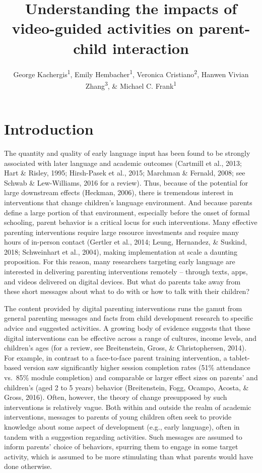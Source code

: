 \documentclass[man,floatsintext]{apa6}
\affiliation{
\vspace{0.5cm}
\textsuperscript{1} Department of Psychology, Stanford University\\\textsuperscript{2} Gallaudet University\\\textsuperscript{3} Cornell University}
\title{Understanding the impacts of video-guided activities on parent-child interaction}
\author{George Kachergis\textsuperscript{1}, Emily Hembacher\textsuperscript{1}, Veronica Cristiano\textsuperscript{2}, Hanwen Vivian Zhang\textsuperscript{3}, \& Michael C. Frank\textsuperscript{1}}
\date{}
\begin{document}
\maketitle

\hypertarget{introduction}{%
\section{Introduction}\label{introduction}}

The quantity and quality of early language input has been found to be strongly associated with later language and academic outcomes (Cartmill et al., 2013; Hart \& Risley, 1995; Hirsh-Pasek et al., 2015; Marchman \& Fernald, 2008; see Schwab \& Lew-Williams, 2016 for a review). Thus, because of the potential for large downstream effects (Heckman, 2006), there is tremendous interest in interventions that change children's language environment.
And because parents define a large portion of that environment, especially before the onset of formal schooling, parent behavior is a critical locus for such interventions.
Many effective parenting interventions require large resource investments and require many hours of in-person contact (Gertler et al., 2014; Leung, Hernandez, \& Suskind, 2018; Schweinhart et al., 2004), making implementation at scale a daunting proposition.
For this reason, many researchers targeting early language are interested in delivering parenting interventions remotely -- through texts, apps, and videos delivered on digital devices.
But what do parents take away from these short messages about what to do with or how to talk with their children?

The content provided by digital parenting interventions runs the gamut from general parenting messages and facts from child development research to specific advice and suggested activities.
A growing body of evidence suggests that these digital interventions can be effective across a range of cultures, income levels, and children's ages (for a review, see Breitenstein, Gross, \& Christophersen, 2014).
For example, in contrast to a face-to-face parent training intervention, a tablet-based version saw significantly higher session completion rates (51\% attendance vs.~85\% module completion) and comparable or larger effect sizes on parents' and children's (aged 2 to 5 years) behavior (Breitenstein, Fogg, Ocampo, Acosta, \& Gross, 2016).
Often, however, the theory of change presupposed by such interventions is relatively vague.
Both within and outside the realm of academic interventions, messages to parents of young children often seek to provide knowledge about some aspect of development (e.g., early language), often in tandem with a suggestion regarding activities.
Such messages are assumed to inform parents' choice of behaviors, spurring them to engage in some target activity, which is assumed to be more stimulating than what parents would have done otherwise.
\end{document}
